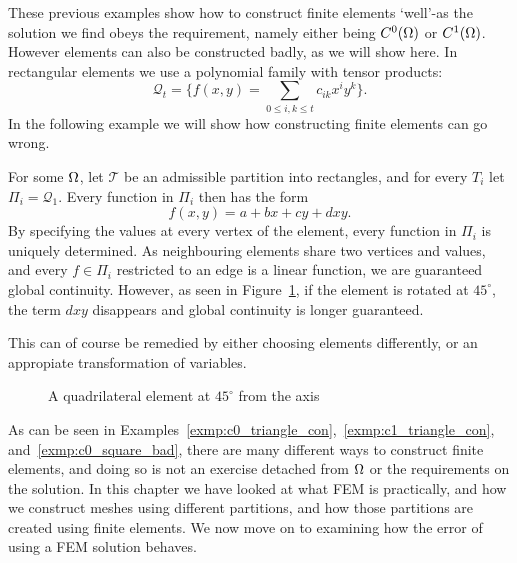 These previous examples show how to construct finite elements `well'-as 
the solution we find obeys the requirement, namely either being $C^0(\Omega)$ or 
$C^1(\Omega)$. However elements can also be constructed badly, as we will 
show here. In rectangular elements we use a polynomial family with 
tensor products:
\begin{equation*}
    \mathcal{Q}_t = \{ f(x,y)= \sum_{0\leq i,k \leq t} c_{ik}x^i y^k \}.
\end{equation*}
In the following example we will show how constructing finite elements 
can go wrong.
\begin{exmp}{\quad\label{exmp:c0_square_bad}}
   For some $\Omega$, let $\mathcal{T}$ be an admissible partition into 
   rectangles, and for every $T_i$ let $\Pi_i = \mathcal{Q}_1$. 
   Every function in $\Pi_i$ then has the form 
   \begin{equation*}
    f(x,y) = a + bx + cy + dxy.
   \end{equation*}
   By specifying the values at every vertex of the element, every 
   function in $\Pi_i$ is uniquely determined. 
   As neighbouring elements share two vertices and values, and every $f\in\Pi_i$
   restricted to an edge is a linear function, we are guaranteed global 
   continuity. However, 
    as seen in Figure~\ref{fig:quad_element_bad}, if the element is rotated 
   at $45^\circ$, the term $dxy$ disappears and global continuity is longer 
   guaranteed.

   This can of course be remedied by either choosing elements differently, 
   or an appropiate transformation of variables.
\end{exmp}
\begin{figure}[ht]
    \centering
    
    \caption{A quadrilateral element at $45^\circ$ from the axis}\label{fig:quad_element_bad}
\end{figure}
As can be seen in Examples~\ref{exmp:c0_triangle_con},~\ref{exmp:c1_triangle_con}, 
and~\ref{exmp:c0_square_bad}, there are many different ways to construct 
finite elements, and doing so is not an exercise detached from $\Omega$ or 
the requirements on the solution. In this chapter we have looked at what FEM is practically, and how we construct 
meshes using different partitions, and how those partitions are created using 
finite elements. We now move on to examining how the error of using a 
FEM solution behaves.